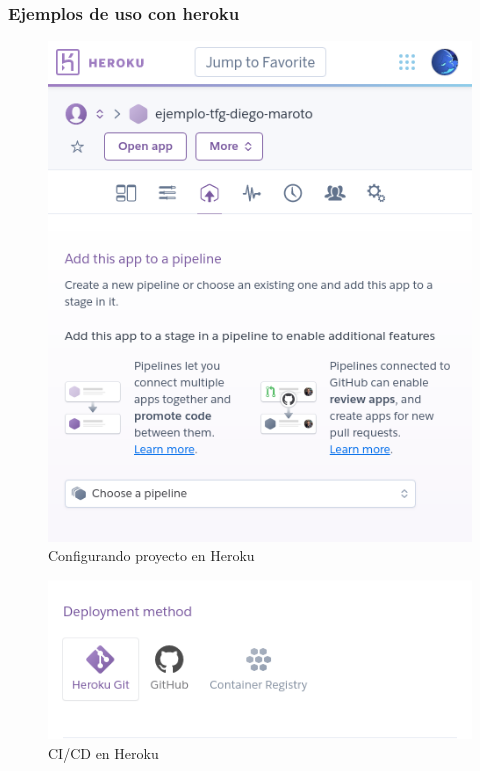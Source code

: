 \subsubsection{Ejemplos de uso con heroku}
\begin{figure}[h]
\centering
\includegraphics[scale=0.5]{archivos/heroku01.png}
\caption{Configurando proyecto en Heroku}
\end{figure}

\begin{figure}[h]
\centering
\includegraphics[scale=0.5]{archivos/heroku02.png}
\caption{CI/CD en Heroku}
\end{figure}

